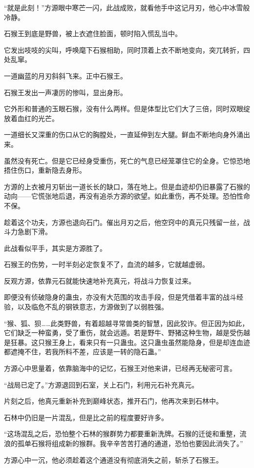 \begin{this_body}
“就是此刻！”方源眼中寒芒一闪，此战成败，就看他手中这记月刃，他心中冰雪般冷静。

石猴王到底是野兽，被上衣遮住脸面，顿时陷入慌乱当中。

它发出吱吱的尖叫，呼唤麾下石猴相助，同时顶着上衣不断地变向，突兀转折，四处乱窜。

一道幽蓝的月刃斜斜飞来。正中石猴王。

石猴王发出一声凄厉的惨叫，显出身形。

它外形和普通的玉眼石猴，没有什么两样。但是体型比它们大了三倍，同时双眼绽放着血红的光芒。

一道细长又深重的伤口从它的胸膛处，一直延伸到左大腿。鲜血不断地向身外涌出来。

虽然没有死亡。但是它已经身受重伤，死亡的气息已经笼罩住它的全身。它惊恐地捂住伤口，重新隐去身形。

方源的上衣被月刃斩出一道长长的缺口，落在地上。但是血迹却仍旧暴露了石猴的动向——它慌张地后退，再没有追杀方源的欲望。如此重伤，再不处理。恐怕性命不保。

趁着这个功夫，方源也退向石门。催出月刃之后，他空窍中的真元只残留一丝，战斗力急剧下滑。

此战看似平手，其实是方源胜了。

石猴王的伤势，一时半刻必定恢复不了，血流的越多，它就越虚弱。

反观方源，依靠元石就能快速地补充真元，将战斗力恢复过来。

即便没有侦破隐身的蛊虫，亦没有大范围的攻击手段，但是凭借着丰富的战斗经验，以及临危不乱的钢铁意志，方源做到了以弱胜强。

“猴、狐、狈……此类野兽，有着超越寻常兽类的智慧，因此狡诈。但正因为如此，它们缺乏一种蛮勇，受了重伤，就会远遁。若是野牛、野猪这种生物，越是受伤越是狂暴。这只猴王身上，看来只有一只蛊虫。这只蛊虫虽然能隐身，但是却连血迹都遮掩不住，若我所料不差，应该是一转的隐石蛊。”

方源心中思量着，依靠脑海中的记忆，石猴王对他来讲，已经再无秘密可言。

“战局已定了。”方源退回到石室，关上石门，利用元石补充真元。

片刻之后，他真元重新补充到巅峰状态，推开石门，他再次来到石林中。

石林中仍旧是一片混乱，但是比之前的程度要好许多。

“这场混乱之后，恐怕整个石林的猴群势力都要重新洗牌。石猴的迁徙和重整，流浪的孤单石猴将组成新的猴群。我辛辛苦苦打通的通道，恐怕也要因此消失了。”

方源心中一沉，他必须趁着这个通道没有彻底消失之前，斩杀了石猴王。


\end{this_body}
